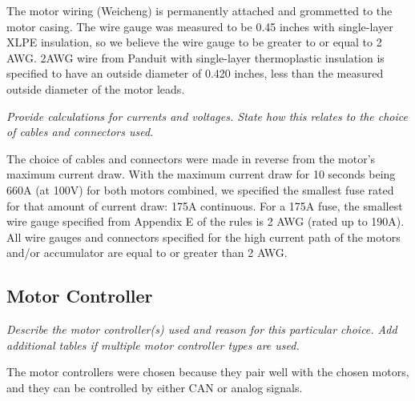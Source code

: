 \documentclass{article}
\begin{document}
    The motor wiring (Weicheng) is permanently attached and grommetted to the motor casing. The wire gauge was measured to be 0.45 inches with single-layer XLPE insulation, so we believe the wire gauge to be greater to or equal to 2 AWG. 2AWG wire from Panduit with single-layer thermoplastic insulation is specified to have an outside diameter of 0.420 inches, less than the measured outside diameter of the motor leads.

    \textit{Provide calculations for currents and voltages. State how this relates to the choice of cables and connectors used.}

    The choice of cables and connectors were made in reverse from the motor's maximum current draw. With the maximum current draw for 10 seconds being 660A (at 100V) for both motors combined, we specified the smallest fuse rated for that amount of current draw: 175A continuous. For a 175A fuse, the smallest wire gauge specified from Appendix E of the rules is 2 AWG (rated up to 190A). All wire gauges and connectors specified for the high current path of the motors and/or accumulator are equal to or greater than 2 AWG.

    \subsection{Motor Controller}

    \textit{Describe the motor controller(s) used and reason for this particular choice. Add additional tables if multiple motor controller types are used.}

    The motor controllers were chosen because they pair well with the chosen motors, and they can be controlled by either CAN or analog signals.
\end{document}
